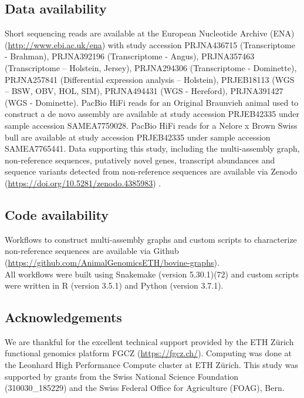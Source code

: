 \documentclass[../main.tex]{subfiles}
\begin{document}
\subsection*{Data availability}

Short sequencing reads are available at the European Nucleotide Archive (ENA) (\url{http://www.ebi.ac.uk/ena}) with study accession PRJNA436715 (Transcriptome - Brahman), PRJNA392196 (Transcriptome - Angus), PRJNA357463 (Transcriptome – Holstein, Jersey), PRJNA294306 (Transcriptome - Dominette), PRJNA257841 (Differential expression analysis – Holstein), PRJEB18113 (WGS – BSW, OBV, HOL, SIM), PRJNA494431 (WGS - Hereford), PRJNA391427 (WGS - Dominette). PacBio HiFi reads for an Original Braunvieh animal used to construct a de novo assembly are available at study accession PRJEB42335 under sample accession SAMEA7759028. PacBio HiFi reads for a Nelore x Brown Swiss bull are available at study accession PRJEB42335 under sample accession SAMEA7765441. Data supporting this study, including the multi-assembly graph, non-reference sequences, putatively novel genes, transcript abundances and sequence variants detected from non-reference sequences are available via Zenodo (\url{https://doi.org/10.5281/zenodo.4385983}) \citep{Crysnanto2021}. 

\subsection*{Code availability}

Workflows to construct multi-assembly graphs and custom scripts to characterize non-reference sequences are available via Github \\
(\url{https://github.com/AnimalGenomicsETH/bovine-graphs}). \\
All workflows were built using Snakemake (version 5.30.1)(72) and custom scripts were written in R (version 3.5.1) \citep{RCoreTeam2017} and Python (version 3.7.1). 

\subsection*{Acknowledgements}

We are thankful for the excellent technical support provided by the ETH Zürich functional genomics platform FGCZ (\url{https://fgcz.ch/}). Computing was done at the Leonhard High Performance Compute cluster at ETH Zürich. This study was supported by grants from the Swiss National Science Foundation (310030\_185229) and the Swiss Federal Office for Agriculture (FOAG), Bern.



\singlespacing
\footnotesize

\let\Origclearpage\clearpage
\let\clearpage\relax


% 



\let\clearpage\Origclearpage

\ifdefined\BuildingFromMainFile
\else
   
\end{document}
